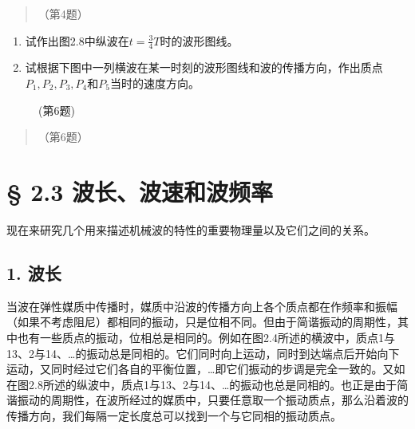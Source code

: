 \begin{quote}
（第4题）
\end{quote}

\begin{enumerate}
\def\labelenumi{\arabic{enumi}.}
\setcounter{enumi}{4}
\item
  试作出图2.8中纵波在\(t = \frac{3}{4} T\)时的波形图线。
\item
  试根据下图中一列横波在某一时刻的波形图线和波的传播方向，作出质点\(P_{1}, P_{2}, P_{3}, P_{4}\)和\(P_{5}\)当时的速度方向。
\end{enumerate}

\begin{figure}
\centering
{}
\caption{(第6题)}
\end{figure}

\begin{quote}
（第6题）
\end{quote}

\section{§ 2.3
波长、波速和波频率}\label{ux6ce2ux957fux6ce2ux901fux548cux6ce2ux9891ux7387}

现在来研究几个用来描述机械波的特性的重要物理量以及它们之间的关系。

\subsection{1. 波长}\label{ux6ce2ux957f}

当波在弹性媒质中传播时，媒质中沿波的传播方向上各个质点都在作频率和振幅（如果不考虑阻尼）都相同的振动，只是位相不同。但由于简谐振动的周期性，其中也有一些质点的振动，位相总是相同的。例如在图2.4所述的横波中，质点1与13、2与14、\ldots 的振动总是同相的。它们同时向上运动，同时到达端点后开始向下运动，又同时经过它们各自的平衡位置，\ldots 即它们振动的步调是完全一致的。又如在图2.8所述的纵波中，质点1与13、2与14、\ldots 的振动也总是同相的。也正是由于简谐振动的周期性，在波所经过的媒质中，只要任意取一个振动质点，那么沿着波的传播方向，我们每隔一定长度总可以找到一个与它同相的振动质点。

